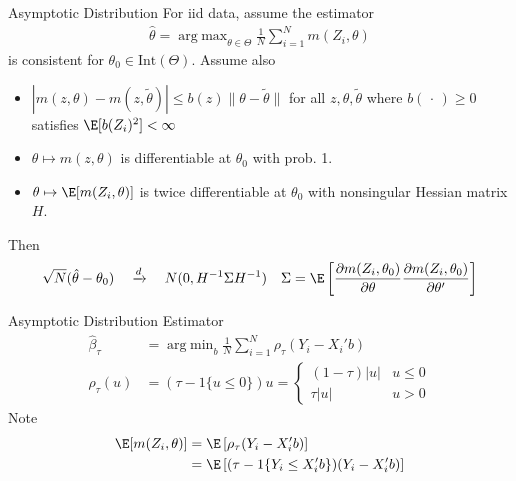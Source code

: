 \documentclass[handout]{beamer}
\DeclareMathOperator*{\argmin}{arg\;min}
\DeclareMathOperator*{\argmax}{arg\;max}
\newcommand{\dto}{\xrightarrow{d}}
\newcommand{\sumiN}{\sum^N_{i=1}}
\begin{document}
\begin{frame}[shrink]{Asymptotic Distribution}
For iid data, assume the estimator
\begin{align*}
  \hat{\theta}
  =
  \argmax_{\theta\in\Theta}
  \frac{1}{N}
  \sumiN
  m(Z_i,\theta)
\end{align*}
is consistent for $\theta_0\in \text{Int}(\Theta)$.
Assume also
\begin{itemize}
  \item
    $|m(z,\theta)-m(z,\tilde{\theta})|\leq b(z)\lVert
    \theta-\tilde{\theta}\rVert$
    for all $z,\theta,\tilde{\theta}$ where
    $b(\,\cdot\,)\geq 0$
    satisfies $\E[b(Z_i)^2]<\infty$
  \item $\theta\mapsto m(z,\theta)$ is differentiable at $\theta_0$ with
    prob. 1.
  \item $\theta\mapsto \E[m(Z_i,\theta)]$ is twice differentiable at
    $\theta_0$ with nonsingular Hessian matrix $H$.
\end{itemize}
Then
\begin{align*}
  \sqrt{N}(\hat{\theta}-\theta_0)
  \quad\dto\quad
  N(0,H^{-1}\Sigma H^{-1})
  \quad
  \Sigma
  =
  \E
  \left[
    \frac{\partial m(Z_i,\theta_0)}{\partial \theta}
    \frac{\partial m(Z_i,\theta_0)}{\partial \theta'}
  \right]
\end{align*}
\end{frame}



\begin{frame}[shrink]{Asymptotic Distribution}
Estimator
\begin{align*}
  \hat{\beta}_\tau
  &=
  \argmin_b
  \frac{1}{N}
  \sumiN
  \rho_\tau(Y_i-X_i'b)
  \\
  \rho_\tau(u)
  &=
  (\tau-{1}\{u\leq 0\})u
  =
  \begin{cases}
    (1-\tau)|u| & u \leq 0 \\
    \tau|u| & u > 0
  \end{cases}
\end{align*}
Note
\begin{align*}
  \E[m(Z_i,\theta)]
  &=
  \E\left[
    \rho_\tau(Y_i-X_i'b)
  \right]
  \\
  &=
  \E\left[
    (\tau-{1}\{Y_i\leq X_i'b\})(Y_i-X_i'b)
  \right]
\end{align*}
\end{frame}
\end{document}
